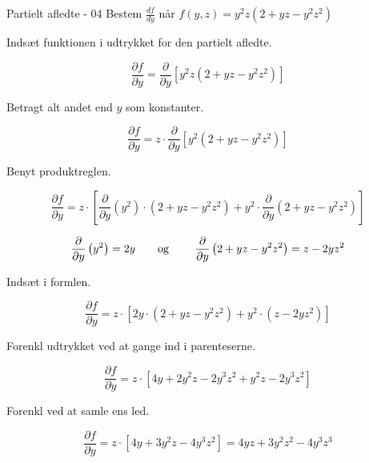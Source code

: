 \documentclass{article}
\begin{document}
\begin{exercise}{Partielt afledte - 04}
	Bestem $\frac{df}{dy}$ når $f(y,z) = y^2z\left(2+yz-y^2z^2\right)$ 
	
	
	\hint
	Indsæt funktionen i udtrykket for den partielt afledte.
	
	\hint
	
	\[
	\frac{\partial f}{\partial y} = \frac{\partial }{\partial y} \left[y^2z\left(2+yz-y^2z^2\right)\right]
	\]
	
	\hint
	Betragt alt andet end $y$ som konstanter.
	
	\hint
	\[
	\frac{\partial f}{\partial y} = z \cdot \frac{\partial }{\partial y} \left[ y^2\left(2+yz-y^2z^2\right) \right]
	\]
	
	\hint
	
	Benyt produktreglen.
	
	\hint
	\[
	\frac{\partial f}{\partial y} = z \cdot \left[\frac{\partial }{\partial y}\left(y^2 \right) \cdot \left(2 + yz -y^2z^2 \right) + y^2 \cdot \frac{\partial}{\partial y} \left(2+yz-y^2z^2\right) \right]
	\]
	
	\hint
	\[\frac{\partial }{\partial y} \left(y^2\right) = 2y \textrm{\qquad og \qquad} \frac{\partial }{\partial y} \left(2 + yz-y^2z^2\right) = z-2yz^2
	\]
	
	\hint
	Indsæt i formlen.
	
	\hint
	\[
	\frac{\partial f}{\partial y} = z \cdot \left[2y \cdot \left(2+yz-y^2z^2\right)  + y^2 \cdot (z-2yz^2) \right]
	\]
	
	\hint
	Forenkl udtrykket ved at gange ind i parenteserne.
	
	\hint
	\[
	\frac{\partial f}{\partial y} = z \cdot \left[4y + 2y^2z -2y^3z^2 + y^2z -2y^3z^2 \right]
	\]
	
	\hint 
	Forenkl ved at samle ens led.

	\hint
	\[
	\frac{\partial f}{\partial y} = z \cdot \left[4y + 3y^2z -4y^3z^2 \right] = 4yz + 3y^2z^2 -4y^3z^3 
	\]
	
\end{exercise}

\newpage
\end{document}
